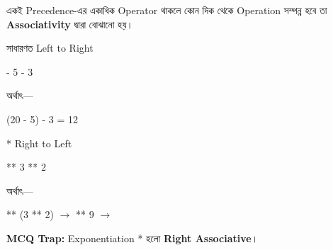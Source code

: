 

একই Precedence-এর একাধিক Operator থাকলে কোন দিক থেকে
Operation সম্পন্ন হবে তা \textbf{Associativity} দ্বারা বোঝানো হয়।

\noindent
\begin{minipage}[t]{0.49\linewidth}

\begin{sideexamplebox}{সাধারণত Left to Right}

\begin{sidecodebox}
\begin{english}
 - 5 - 3
\end{english}
\end{sidecodebox}

অর্থাৎ—

\begin{center}
\textenglish{\ttfamily (20 - 5) - 3 = 12}
\end{center}

\end{sideexamplebox}

\end{minipage}
\hfill
\begin{minipage}[t]{0.49\linewidth}

\begin{sideexamplebox}{\textenglish{\ttfamily **} Right to Left}

\begin{sidecodebox}
\begin{english}
 ** 3 ** 2
\end{english}
\end{sidecodebox}

অর্থাৎ—

\begin{center}

\textenglish{ ** (3 ** 2)}
\(\longrightarrow\)
\textenglish{ ** 9}
\(\longrightarrow\)
\textenglish{}

\end{center}

\end{sideexamplebox}

\end{minipage}

\begin{rememberbox}

\textbf{\color{deepOrange}MCQ Trap:}
Exponentiation
\textenglish{\ttfamily **}
হলো \textbf{Right Associative}।

\end{rememberbox}

